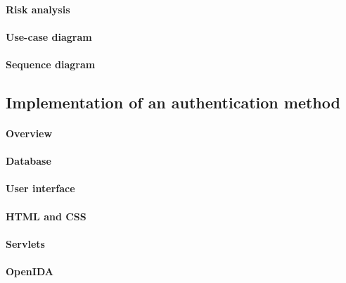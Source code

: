 \documentclass[11pt,a4paper]{article}
\begin{document}
\paragraph{Risk analysis}

\paragraph{Use-case diagram}

\paragraph{Sequence diagram}

\subsection*{Implementation of an authentication method}
\paragraph{Overview}

\paragraph{Database}
\paragraph{User interface}
\paragraph{HTML and CSS}
\paragraph{Servlets}
\paragraph{OpenIDA}
\end{document}
